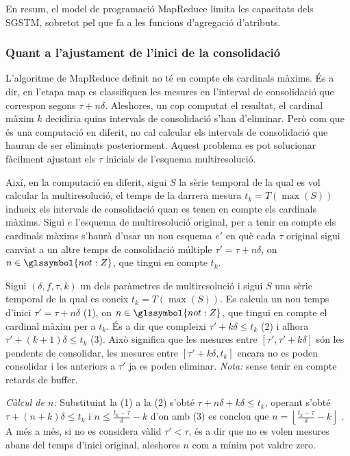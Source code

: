 En resum, el model de programació MapReduce limita les capacitats dels
\gls{SGSTM}, sobretot pel que fa a les funcions d'agregació
d'atributs. 



\subsubsection{Quant a l'ajustament de l'inici de la consolidació}

L'algoritme de MapReduce definit no té en compte els cardinals màxims.
És a dir, en l'etapa map es classifiquen les mesures en l'interval de
consolidació que correspon segons $\tau+n\delta$.  Aleshores, un cop
computat el resultat, el cardinal màxim $k$ decidiria quins intervals
de consolidació s'han d'eliminar.  Però com que és una computació en
diferit, no cal calcular els intervals de consolidació que hauran de
ser eliminats posteriorment.  Aquest problema es pot solucionar
fàcilment ajustant els $\tau$ inicials de l'esquema multiresolució.


Així, en la computació en diferit, sigui $S$ la sèrie temporal de la
qual es vol calcular la multiresolució, el temps de la darrera mesura
$t_k=T(\max(S))$ indueix els intervals de consolidació quan es tenen en
compte els cardinals màxims. Sigui $e$ l'esquema de multiresolució
original, per a tenir en compte els cardinals màxims s'haurà d'usar un
nou esquema $e'$ en què cada $\tau$ original sigui canviat a un altre
temps de consolidació múltiple $\tau'= \tau+n\delta$, on
$n\in\glssymbol{not:Z}$, que tingui en compte $t_k$.



\begin{definition}
  \label{def:mapreduce:ajustamentdetaus}

  Sigui $(\delta,f,\tau,k)$ un dels paràmetres de multiresolució i
  sigui $S$ una sèrie temporal de la qual es coneix $t_k=T(\max(S))$.
  Es calcula un nou temps d'inici $\tau'= \tau+n\delta$ (1), on
  $n\in\glssymbol{not:Z}$, que tingui en compte el cardinal màxim per
  a $t_k$. És a dir que compleixi $\tau'+k\delta \leq t_k$ (2) i
  alhora $\tau'+(k+1)\delta \leq t_k$ (3).  Això significa
  que les mesures entre $[\tau',\tau'+k\delta]$ són les pendents de
  consolidar, les mesures entre $[\tau'+k\delta,t_k]$ encara no es
  poden consolidar i les anteriors a $\tau'$ ja es poden
  eliminar. \emph{Nota:} sense tenir en compte retards de buffer.


  \emph{Càlcul de $n$:} Substituint la (1) a la (2) s'obté
  $\tau+n\delta+k\delta \leq t_k$, operant s'obté $\tau+(n+k)\delta
  \leq t_k$ i $n \leq \frac{t_k-\tau}{\delta}-k$ d'on amb (3) es
  conclou que $n = \left\lfloor \frac{t_k-\tau}{\delta}-k
  \right\rfloor$ .  A més a més, si no es considera vàlid
  $\tau'<\tau$, és a dir que no es volen mesures abans del temps
  d'inici original, aleshores $n$ com a mínim pot valdre zero.

\end{definition}



